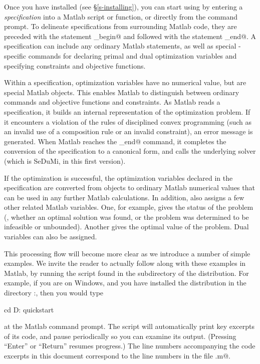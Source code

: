 \documentclass[12pt]{article}
\begin{document}
Once you have installed \cvx (see \S\ref{s-installing}), you can
start using \cvx by entering a \cvx \emph{specification} into a
Matlab script or function, or directly from the command prompt.
To delineate \cvx specifications from surrounding Matlab code,
they are preceded with the statement
\verb@cvx_begin@ and followed with the statement
\verb@cvx_end@. A specification can
include any ordinary Matlab statements, as well as
special \cvx-specific commands for declaring primal and dual 
optimization variables and specifying constraints and
objective functions.

Within a \cvx specification, optimization variables have no numerical
value, but are special Matlab objects.   
This enables Matlab to distinguish
between ordinary commands and \cvx objective
functions and constraints. As Matlab reads a \cvx specification,
it builds an internal representation of the
optimization problem. If it encounters a
violation of the rules of disciplined convex programming
(such as an invalid use of a composition rule or an invalid
constraint), an error message is generated.
When Matlab reaches 
the \verb@cvx_end@ command, it completes the conversion of
the \cvx specification to a canonical form,
and calls the underlying solver 
(which is SeDuMi, in this first version).

If the optimization is successful,
the optimization variables declared in the \cvx specification
are converted from objects to ordinary Matlab numerical values
that can be used in any further Matlab calculations. In addition,
\cvx also assigns a few other related Matlab variables.
One, for example, gives the status of the problem (\ie, whether an
optimal solution was found, or the problem was determined to be 
infeasible or unbounded).  Another gives the optimal value
of the problem. Dual variables can also be assigned.

This processing flow will become more clear as we introduce
a number of simple examples. We invite the reader to actually follow
along with these examples in Matlab, by running the \verb@quickstart@
script found in the \verb@examples@ subdirectory of the \cvx distribution. 
For example,
if you are on Windows, and you have installed the \cvx distribution
in the directory \verb@D:\Matlab\cvx@, then you would type
\begin{code}
	cd D:\Matlab\cvx\examples
	quickstart
\end{code}
at the Matlab command prompt.
The script will automatically print key excerpts of its code, and
pause periodically so you can examine its output. (Pressing ``Enter''
or ``Return'' resumes progress.) 
The line numbers accompanying the code excerpts in this
document correspond to the line numbers in the file \verb@quickstart.m@.
\end{document}
